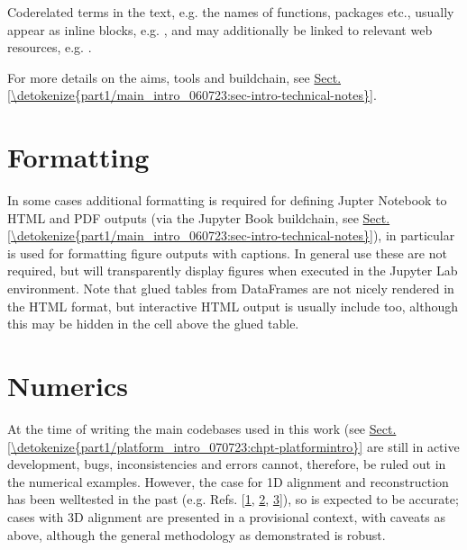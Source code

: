 \documentclass[letterpaper,table,10pt,english]{jupyterBook}
\begin{document}
\sphinxAtStartPar
Code\sphinxhyphen{}related terms in the text, e.g. the names of functions, packages etc., usually appear as in\sphinxhyphen{}line blocks, e.g. , and may additionally be linked to relevant web resources, e.g. .

\sphinxAtStartPar
For more details on the aims, tools and build\sphinxhyphen{}chain, see \hyperref[\detokenize{part1/main_intro_060723:sec-intro-technical-notes}]{Sect.\@ \ref{\detokenize{part1/main_intro_060723:sec-intro-technical-notes}}}.


\section{Formatting}
\label{\detokenize{frontmatter/book_versions_note:formatting}}
\sphinxAtStartPar
In some cases additional formatting is required for defining Jupter Notebook to HTML and PDF outputs (via the Jupyter Book build\sphinxhyphen{}chain, see \hyperref[\detokenize{part1/main_intro_060723:sec-intro-technical-notes}]{Sect.\@ \ref{\detokenize{part1/main_intro_060723:sec-intro-technical-notes}}}), in particular  is used for formatting figure outputs with captions. In general use these are not required, but will transparently display figures when executed in the Jupyter Lab environment. Note that glued tables from  DataFrames are not nicely rendered in the HTML format, but interactive HTML output is usually include too, although this may be hidden in the cell above the glued table.


\section{Numerics}
\label{\detokenize{frontmatter/book_versions_note:numerics}}\label{\detokenize{frontmatter/book_versions_note:sec-numerics-disclaimer}}
\sphinxAtStartPar
At the time of writing the main code\sphinxhyphen{}bases used in this work (see \hyperref[\detokenize{part1/platform_intro_070723:chpt-platformintro}]{Sect.\@ \ref{\detokenize{part1/platform_intro_070723:chpt-platformintro}}} are still in active development, bugs, inconsistencies and errors cannot, therefore, be ruled out in the numerical examples. However, the case for 1D alignment and reconstruction has been well\sphinxhyphen{}tested in the past (e.g. Refs. {[}\hyperlink{cite.backmatter/bibliography:id776}{1}, \hyperlink{cite.backmatter/bibliography:id685}{2}, \hyperlink{cite.backmatter/bibliography:id686}{3}{]}), so is expected to be accurate; cases with 3D alignment are presented in a provisional context, with caveats as above, although the general methodology as demonstrated is robust.
\end{document}
